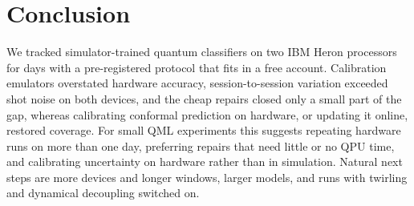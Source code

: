 \section{Conclusion}
\label{sec:conclusion}
We tracked simulator-trained quantum classifiers on two IBM Heron processors for
 days with a pre-registered protocol that fits in a free account. Calibration
emulators overstated hardware accuracy, session-to-session variation exceeded shot noise on both
devices, and the cheap repairs closed only a small part of the gap, whereas calibrating
conformal prediction on hardware, or updating it online, restored coverage.
For small QML experiments this suggests repeating hardware runs on more than one day, preferring
repairs that need little or no QPU time, and calibrating uncertainty on hardware rather than in
simulation. Natural next steps are more devices and longer windows, larger models, and runs with
twirling and dynamical decoupling switched on.
